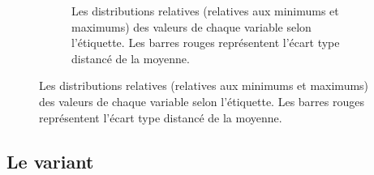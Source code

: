 \documentclass[
  oneside,
  open=any]{scrreprt}
\begin{document}
\begin{figure}

\begin{minipage}{\linewidth}

\begin{figure}[H]


\caption{\label{fig-violin-facet}Les distributions relatives (relatives
aux minimums et maximums) des valeurs de chaque variable selon
l'étiquette. Les barres rouges représentent l'écart type distancé de la
moyenne.}

\end{figure}%

\end{minipage}%

\end{figure}%

\subsection{Le variant}\label{le-variant}
\end{document}

